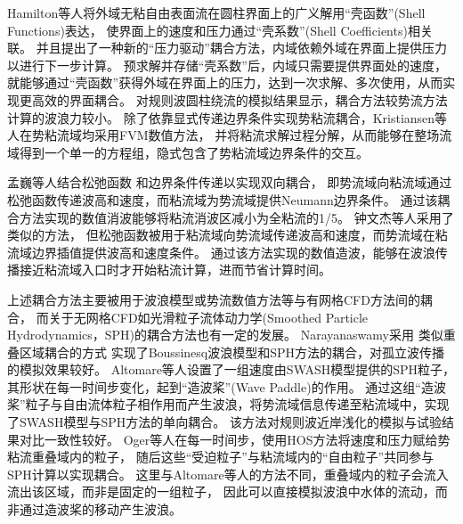 Hamilton等人\cite{hamiltonViscousinviscidMatchingWave2002}将外域无粘自由表面流在圆柱界面上的广义解用“壳函数”(Shell Functions)表达，%
使界面上的速度和压力通过“壳系数”(Shell Coefficients)相关联。%
并且提出了一种新的“压力驱动”耦合方法，内域依赖外域在界面上提供压力以进行下一步计算。%
预求解并存储“壳系数”后，内域只需要提供界面处的速度，就能够通过“壳函数”获得外域在界面上的压力，达到一次求解、多次使用，从而实现更高效的界面耦合。%
对规则波圆柱绕流的模拟结果显示，耦合方法较势流方法计算的波浪力较小。%
除了依靠显式传递边界条件实现势粘流耦合，Kristiansen等人\cite{kristiansenGapResonanceAnalyzed2012}在势粘流域均采用FVM数值方法，%
并将粘流求解过程分解，从而能够在整场流域得到一个单一的方程组，隐式包含了势粘流域边界条件的交互。

孟巍等人\cite{孟JiYuShuangXiangShiLiuNianLiuOuHeDeShuZhiXiaoBoMoNi2022}结合松弛函数\cite{paulsenEfficientDomainDecomposition2014}%
和边界条件传递\cite{campanaDomainDecompositionFree1994}以实现双向耦合，%
即势流域向粘流域通过松弛函数传递波高和速度，而粘流域为势流域提供Neumann边界条件。%
通过该耦合方法实现的数值消波能够将粘流消波区减小为全粘流的1/5。%
钟文杰等人\cite{钟JiYuShiLiuNianLiuShuangXiangOuHeMoXingDeShuZhiZaoBo2022}采用了类似的方法，%
但松弛函数被用于粘流域向势流域传递波高和速度，而势流域在粘流域边界插值提供波高和速度条件。%
通过该方法实现的数值造波，能够在波浪传播接近粘流域入口时才开始粘流计算，进而节省计算时间。

上述耦合方法主要被用于波浪模型或势流数值方法等与有网格CFD方法间的耦合，%
而关于无网格CFD如光滑粒子流体动力学(Smoothed Particle Hydrodynamics，SPH)的耦合方法也有一定的发展。%
Narayanaswamy\cite{narayanaswamyHybridBoussinesqSPHWave2008}采用%
类似重叠区域耦合\cite{campanaViscousinviscidCouplingFree1995}的方式%
实现了Boussinesq波浪模型和SPH方法的耦合，对孤立波传播的模拟效果较好。%
Altomare等人\cite{altomareCouplingSWASHSPH2014}设置了一组速度由SWASH模型提供的SPH粒子，%
其形状在每一时间步变化，起到“造波桨”(Wave Paddle)的作用。%
通过这组“造波桨”粒子与自由流体粒子相作用而产生波浪，将势流域信息传递至粘流域中，实现了SWASH模型与SPH方法的单向耦合。%
该方法对规则波近岸浅化的模拟与试验结果对比一致性较好。%
Oger等人\cite{ogerCoupledSPHspectralMethod2014}在每一时间步，使用HOS方法将速度和压力赋给势粘流重叠域内的粒子，%
随后这些“受迫粒子”与粘流域内的“自由粒子”共同参与SPH计算以实现耦合。%
这里与Altomare等人\cite{altomareCouplingSWASHSPH2014}的方法不同，重叠域内的粒子会流入流出该区域，而非是固定的一组粒子，%
因此可以直接模拟波浪中水体的流动，而非通过造波桨\cite{altomareCouplingSWASHSPH2014}的移动产生波浪。

